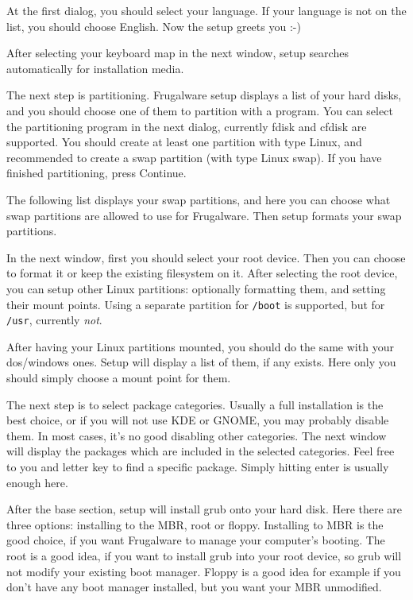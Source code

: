 At the first dialog, you should select your language. If your language is not on the list, you should choose English. Now the setup greets you :-)

 After selecting your keyboard map in the next window, setup searches automatically for installation media.
 
 The next step is partitioning. Frugalware setup displays a list of your hard disks, and you should choose one of them to partition with a program. You can select the partitioning program in the next dialog, currently fdisk and cfdisk are supported. You should create at least one partition with type Linux, and recommended to create a swap partition (with type Linux swap). If you have finished partitioning, press Continue.
 
The following list displays your swap partitions, and here you can choose what swap partitions are allowed to use for Frugalware. Then setup formats your swap partitions.

In the next window, first you should select your root device. Then you can choose to format it or keep the existing filesystem on it. After selecting the root device, you can setup other Linux partitions: optionally formatting them, and setting their mount points. Using a separate partition for {\tt /boot} is supported, but for {\tt /usr}, currently \textit{not}.

After having your Linux partitions mounted, you should do the same with your dos/windows ones. Setup will display a list of them, if any exists. Here only you should simply choose a mount point for them.

The next step is to select package categories. Usually a full installation is the best choice, or if you will not use KDE or GNOME, you may probably disable them. In most cases, it's no good disabling other categories. The next window will display the packages which are included in the selected categories. Feel free to you and letter key to find a specific package. Simply hitting enter is usually enough here. 

After the base section, setup will install grub onto your hard disk. Here there are three options: installing to the MBR, root or floppy. Installing to MBR is the good choice, if you want Frugalware to manage your computer's booting. The root is a good idea, if you want to install grub into your root device, so grub will not modify your existing boot manager. Floppy is a good idea for example if you don't have any boot manager installed, but you want your MBR unmodified.

